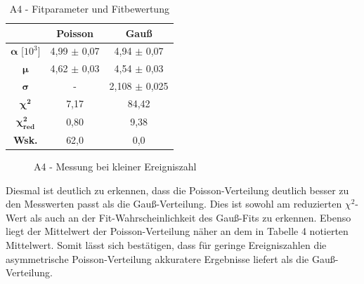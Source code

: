 \documentclass{article}
\begin{document}
\begin{table}[!h]
    \centering
    \begin{tabular}{ccc}
        \hline
         & \textbf{Poisson} & \textbf{Gauß} \\ \hline
        $\bm{\alpha}$ [$10^{3}$] & 4,99 $\pm$ 0,07 & 4,94 $\pm$ 0,07 \\
        $\bm{\mu}$ & 4,62 $\pm$ 0,03 & 4,54 $\pm$ 0,03 \\
        $\bm{\sigma}$ & - & 2,108 $\pm$ 0,025 \\ \hline
        $\bm{\chi^2}$ & 7,17 & 84,42 \\
        $\bm{\chi^2_{red}}$ & 0,80 & 9,38 \\
        \textbf{Wsk.} & 62,0 & 0,0 \\ \hline
    \end{tabular}%
    \caption{A4 - Fitparameter und Fitbewertung}
    \label{tab:A4-Fits}
\end{table}

\phantom{.}

\begin{figure}[!b]
    \centering
    \caption{A4 - Messung bei kleiner Ereigniszahl}
    \label{fig:A4-Nklein}
\end{figure}

Diesmal ist deutlich zu erkennen, dass die Poisson-Verteilung deutlich besser zu den Messwerten passt als die Gauß-Verteilung. Dies ist sowohl am reduzierten $\chi^2$-Wert als auch an der Fit-Wahrscheinlichkeit des Gauß-Fits zu erkennen. Ebenso liegt der Mittelwert der Poisson-Verteilung näher an dem in Tabelle 4 notierten Mittelwert. Somit lässt sich bestätigen, dass für geringe Ereigniszahlen die asymmetrische Poisson-Verteilung akkuratere Ergebnisse liefert als die Gauß-Verteilung.
\end{document}
